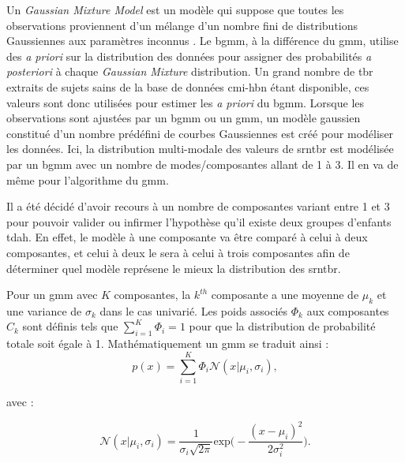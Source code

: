 Un \textit{Gaussian Mixture Model} est un modèle qui suppose que toutes les observations proviennent d'un mélange 
d'un nombre fini de distributions Gaussiennes aux paramètres inconnus \citep{Yu2016}. 
Le \gls{bgmm}, à la différence du \gls{gmm}, utilise des \textit{a priori} sur la distribution des données pour 
assigner des probabilités \textit{a posteriori} à chaque \textit{Gaussian Mixture} distribution. Un grand nombre de \gls{tbr} 
extraits de sujets sains de la base de données \gls{cmi-hbn} étant disponible, ces valeurs sont donc utilisées pour estimer les \textit{a priori} du \gls{bgmm}. 
Lorsque les observations sont ajustées par un \gls{bgmm} ou un \gls{gmm}, un modèle gaussien constitué d'un nombre prédéfini de courbes Gaussiennes est 
créé pour modéliser les données. Ici, la distribution multi-modale des valeurs de \gls{srntbr} est modélisée par un \gls{bgmm} avec un nombre 
de modes/composantes allant de 1 à 3. 
Il en va de même pour l'algorithme du \gls{gmm}. 

Il a été décidé d'avoir recours à un nombre de composantes variant entre 1 et 3 pour pouvoir valider ou infirmer l'hypothèse qu'il existe deux groupes d'enfants \gls{tdah}.
En effet, le modèle à une composante va être comparé à celui à deux composantes, et celui à deux le sera à celui à trois composantes afin de déterminer quel modèle 
représene le mieux la distribution des \gls{srntbr}. 

Pour un \gls{gmm} avec $K$ composantes, la $k^{th}$ composante a une moyenne de $\mu_k$ et une variance de $\sigma_k$ dans le cas univarié. Les poids associés $\Phi_k$ aux composantes
$C_k$ sont définis tels que $\sum_{i=1}^{K} \Phi_i = 1$ pour que la distribution de probabilité totale soit égale à 1. Mathématiquement un \gls{gmm} se traduit ainsi \citep{Santosh2013} :
\begin{equation}
\label{eq:tbr_gmm_univariate}
p(x) = \sum_{i=1}^{K} \Phi_i\mathcal{N}( x | \mu_i, \sigma_i),
\end{equation}

avec :

\begin{equation}
\label{eq:tbr_gaussian}
\mathcal{N}( x | \mu_i, \sigma_i) = \frac{1}{\sigma_i\sqrt{2\pi}} \text{exp}\Big(-\frac{(x - \mu_i)^2}{2\sigma_i^2}\Big).
\end{equation}

